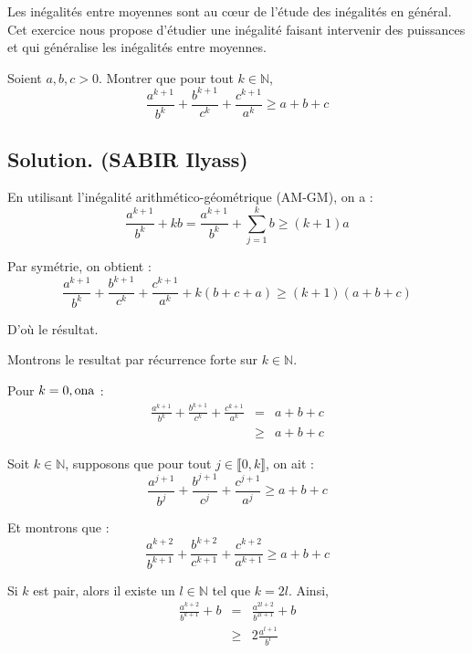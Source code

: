 Les in{\'e}galit{\'e}s entre moyennes sont au c{\oe}ur de l'{\'e}tude des
in{\'e}galit{\'e}s en g{\'e}n{\'e}ral. Cet exercice nous propose d'{\'e}tudier
une in{\'e}galit{\'e} faisant intervenir des puissances et qui
g{\'e}n{\'e}ralise les in{\'e}galit{\'e}s entre moyennes.

\begin{exercise}[]
Soient $a, b, c > 0$. Montrer que pour tout $k \in \mathbb{N}$,
\[ \frac{a^{k + 1}}{b^k} + \frac{b^{k + 1}}{c^k} + \frac{c^{k + 1}}{a^k}
   \geqslant a + b + c \]
\end{exercise}

\subsection*{Solution. (SABIR Ilyass)}


En utilisant l'in{\'e}galit{\'e} arithm{\'e}tico-g{\'e}om{\'e}trique (AM-GM),
on a :
\[ \frac{a^{k + 1}}{b^k} + kb = \frac{a^{k + 1}}{b^k} + \sum^k_{j = 1} b
   \geqslant (k + 1) a \]


Par sym{\'e}trie, on obtient :
\[ \  \]
\[ \frac{a^{k + 1}}{b^k} + \frac{b^{k + 1}}{c^k} + \frac{c^{k + 1}}{a^k} + k
   (b + c + a) \geqslant (k + 1) (a + b + c) \]


D'o{\`u} le r{\'e}sultat.


Montrons le resultat par r{\'e}currence forte sur $k \in \mathbb{N}$.

Pour $k = 0, \operatorname{ona}$ :
\begin{eqnarray*}
  \frac{a^{k + 1}}{b^k} + \frac{b^{k + 1}}{c^k} + \frac{c^{k + 1}}{a^k}
  \underset{}{} & = & a + b + c\\
  & \geqslant & a + b + c
\end{eqnarray*}


Soit $k \in \mathbb{N}$, supposons que pour tout $j \in \llbracket 0, k
\rrbracket$, on ait :
\[ \frac{a^{j + 1}}{b^j} + \frac{b^{j + 1}}{c^j} + \frac{c^{j + 1}}{a^j}
   \geqslant a + b + c \]


Et montrons que :
\[ \frac{a^{k + 2}}{b^{k + 1}} + \frac{b^{k + 2}}{c^{k + 1}} + \frac{c^{k +
   2}}{a^{k + 1}} \geqslant a + b + c \]


Si $k$ est pair, alors il existe un $l \in \mathbb{N}$ tel que $k = 2 l$.
Ainsi,
\begin{eqnarray*}
  \frac{a^{k + 2}}{b^{k + 1}} + b & = & \frac{a^{2 l + 2}}{b^{2 l + 1}} + b\\
  & \geqslant & 2 \frac{a^{l + 1}}{b^l}
\end{eqnarray*}


